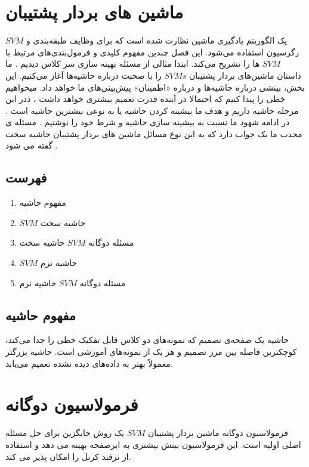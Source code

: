 \documentclass[12pt]{article}
\begin{document}
\fontsize{12pt}{14pt}\selectfont


    
\section{ ماشین های بردار پشتیبان}
$SVM$
یک الگوریتم یادگیری ماشین نظارت شده است که برای وظایف طبقه‌بندی و رگرسیون استفاده می‌شود. این فصل چندین مفهوم کلیدی و فرمول‌بندی‌های مرتبط با $SVM$
‌ها را تشریح می‌کند.
ابتدا مثالی از مسئله بهینه سازی سر کلاس دیدیم . 
ما داستان ماشین‌های بردار پشتیبان
$SVMs$ را با صحبت درباره حاشیه‌ها
آغاز می‌کنیم.
این بخش، بینشی درباره حاشیه‌ها و درباره «اطمینان»
پیش‌بینی‌های
ما خواهد داد.
میخواهیم خطی را پیدا کنیم که احتمالا در آینده قدرت 
تعمیم%
بیشتری خواهد داشت ، ذدر این مرحله 
حاشیه%
داریم و هدف ما 
بیشینه کردن 
حاشیه  
یا به نوعی بیشترین حاشیه است . 
در ادامه شهود ما نسبت به بیشینه سازی حاشیه و شرط خود را نوشتیم .
مسئله ی 
محدب %
ما یک جواب دارد که به این نوع مسائل 
ماشین های بردار پشتیبان حاشیه سخت %
گفته می شود .


\subsection*{فهرست}
\begin{enumerate}
  \item مفهوم حاشیه
  \item $SVM$ حاشیه سخت
  \item مسئله دوگانه $SVM$ حاشیه سخت
  \item $SVM$ حاشیه نرم
  \item مسئله دوگانه $SVM$ حاشیه نرم
\end{enumerate}
\subsection{مفهوم حاشیه}
حاشیه یک صفحه‌ی تصمیم که نمونه‌های دو کلاس قابل تفکیک خطی را جدا می‌کند، کوچکترین فاصله بین مرز تصمیم و هر یک از نمونه‌های آموزشی است. حاشیه بزرگتر معمولاً بهتر به داده‌های دیده نشده تعمیم می‌یابد.

\section{
فرمولاسیون دوگانه
}
%

فرمولاسیون دوگانه ماشین بردار پشتیبان $SVM$ یک روش جایگزین برای حل مسئله اصلی اولیه است. این فرمولاسیون بینش بیشتری به 
ابرصفحه %
بهینه می دهد و استفاده از ترفند کرنل را امکان پذیر می کند.
\end{document}
